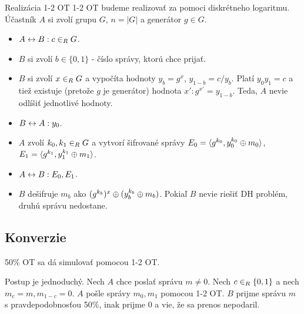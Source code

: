 \begin{priklad}{Realizácia 1-2 OT}
 1-2 OT budeme realizovať za pomoci diskrétneho logaritmu.
 Účastník $A$ si zvolí grupu $G$, $n=|G|$ a generátor $g\in G$.
 \begin{itemize}
    \compactlist
    \item $A \leftrightarrow B: c \in_{R} G$.
    \item $B$ si zvolí $b\in\{0,1\}$ - číslo správy, ktorú chce
    prijať.
    \item $B$ si zvolí $x \in_{R} G$ a vypočíta hodnoty $y_b = g^x$,
    $y_{1-b} = c/ y_b$. Platí $y_0 y_1 = c$ a tiež existuje (pretože
    $g$ je generátor) hodnota $x': g^{x'} = y_{1-b}$. Teda, $A$ nevie
    odlíšiť jednotlivé hodnoty.
    \item $B \leftrightarrow A: y_0$.
    \item $A$ zvolí $k_0,k_1 \in_{R} G$ a vytvorí šifrované správy 
    $E_0 = \langle g^{k_0}, y_0^{k_0} \oplus m_0 \rangle$,
    $E_1 = \langle g^{k_1}, y_1^{k_1} \oplus m_1 \rangle$.
    \item $A \leftrightarrow B: E_0, E_1$.
    \item $B$ dešifruje $m_b$ ako $(g^{k_b})^x \oplus (y_b ^ {k_b} \oplus
    m_b)$.
    Pokiaľ $B$ nevie riešiť DH problém, druhú správu nedostane.
 \end{itemize}
\end{priklad}

\subsection{Konverzie}

\begin{lema}
    50\% OT sa dá simulovať pomocou 1-2 OT.
\end{lema}
\begin{dokaz}
    Postup je jednoduchý. Nech $A$ chce poslať správu $m \ne 0$.
    Nech $c \in_{R} \{0,1\}$ a nech $m_c = m, m_{1-c} = 0$. $A$ pošle
    správy $m_0, m_1$ pomocou 1-2 OT. $B$ prijme správu $m$ s
    pravdepodobnosťou 50\%, inak prijme 0 a vie, že sa prenos
    nepodaril.
\end{dokaz}

